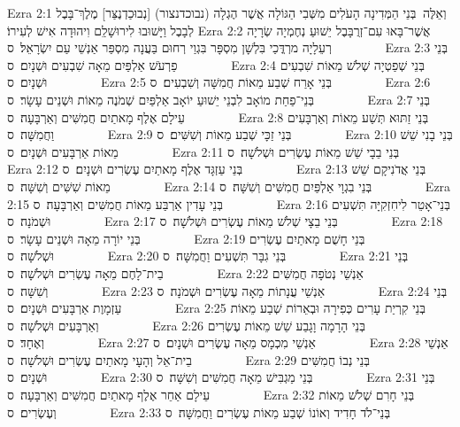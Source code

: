 Ezra 2:1	וְאֵלֶּה  בְּנֵי הַמְּדִינָה הָעֹלִים מִשְּׁבִי הַגּוֹלָה אֲשֶׁר הֶגְלָה (נבוכדנצור) [נְבוּכַדְנֶצַּר] מֶלֶךְ־בָּבֶל לְבָבֶל וַיָּשׁוּבוּ לִירוּשָׁלַ͏ִם וִיהוּדָה אִישׁ לְעִירוֹ׃
Ezra 2:2	אֲשֶׁר־בָּאוּ עִם־זְרֻבָּבֶל יֵשׁוּעַ נְחֶמְיָה שְׂרָיָה רְעֵלָיָה מרְדֳּכַי בִּלְשָׁן מִסְפָּר בִּגְוַי רְחוּם בַּעֲנָה מִסְפַּר אַנְשֵׁי עַם יִשְׂרָאֵל׃ {ס}        
Ezra 2:3	בְּנֵי פַרְעֹשׁ אַלְפַּיִם מֵאָה שִׁבְעִים וּשְׁנָיִם׃ {ס}        
Ezra 2:4	בְּנֵי שְׁפַטְיָה שְׁלֹשׁ מֵאוֹת שִׁבְעִים וּשְׁנָיִם׃ {ס}        
Ezra 2:5	בְּנֵי אָרַח שְׁבַע מֵאוֹת חֲמִשָּׁה וְשִׁבְעִים׃ {ס}        
Ezra 2:6	בְּנֵי־פַחַת מוֹאָב לִבְנֵי יֵשׁוּעַ יוֹאָב אַלְפַּיִם שְׁמֹנֶה מֵאוֹת וּשְׁנֵים עָשָׂר׃ {ס}        
Ezra 2:7	בְּנֵי עֵילָם אֶלֶף מָאתַיִם חֲמִשִּׁים וְאַרְבָּעָה׃ {ס}        
Ezra 2:8	בְּנֵי זַתּוּא תְּשַׁע מֵאוֹת וְאַרְבָּעִים וַחֲמִשָּׁה׃ {ס}        
Ezra 2:9	בְּנֵי זַכָּי שְׁבַע מֵאוֹת וְשִׁשִּׁים׃ {ס}        
Ezra 2:10	בְּנֵי בָנִי שֵׁשׁ מֵאוֹת אַרְבָּעִים וּשְׁנָיִם׃ {ס}        
Ezra 2:11	בְּנֵי בֵבָי שֵׁשׁ מֵאוֹת עֶשְׂרִים וּשְׁלֹשָׁה׃ {ס}        
Ezra 2:12	בְּנֵי עַזְגָּד אֶלֶף מָאתַיִם עֶשְׂרִים וּשְׁנָיִם׃ {ס}        
Ezra 2:13	בְּנֵי אֲדֹנִיקָם שֵׁשׁ מֵאוֹת שִׁשִּׁים וְשִׁשָּׁה׃ {ס}        
Ezra 2:14	בְּנֵי בִגְוָי אַלְפַּיִם חֲמִשִּׁים וְשִׁשָּׁה׃ {ס}        
Ezra 2:15	בְּנֵי עָדִין אַרְבַּע מֵאוֹת חֲמִשִּׁים וְאַרְבָּעָה׃ {ס}        
Ezra 2:16	בְּנֵי־אָטֵר לִיחִזְקִיָּה תִּשְׁעִים וּשְׁמֹנָה׃ {ס}        
Ezra 2:17	בְּנֵי בֵצָי שְׁלֹשׁ מֵאוֹת עֶשְׂרִים וּשְׁלֹשָׁה׃ {ס}        
Ezra 2:18	בְּנֵי יוֹרָה מֵאָה וּשְׁנֵים עָשָׂר׃ {ס}        
Ezra 2:19	בְּנֵי חָשֻׁם מָאתַיִם עֶשְׂרִים וּשְׁלֹשָׁה׃ {ס}        
Ezra 2:20	בְּנֵי גִבָּר תִּשְׁעִים וַחֲמִשָּׁה׃ {ס}        
Ezra 2:21	בְּנֵי בֵית־לָחֶם מֵאָה עֶשְׂרִים וּשְׁלֹשָׁה׃ {ס}        
Ezra 2:22	אַנְשֵׁי נְטֹפָה חֲמִשִּׁים וְשִׁשָּׁה׃ {ס}        
Ezra 2:23	אַנְשֵׁי עֲנָתוֹת מֵאָה עֶשְׂרִים וּשְׁמֹנָה׃ {ס}        
Ezra 2:24	בְּנֵי עַזְמָוֶת אַרְבָּעִים וּשְׁנָיִם׃ {ס}        
Ezra 2:25	בְּנֵי קִרְיַת עָרִים כְּפִירָה וּבְאֵרוֹת שְׁבַע מֵאוֹת וְאַרְבָּעִים וּשְׁלֹשָׁה׃ {ס}        
Ezra 2:26	בְּנֵי הָרָמָה וָגָבַע שֵׁשׁ מֵאוֹת עֶשְׂרִים וְאֶחָד׃ {ס}        
Ezra 2:27	אַנְשֵׁי מִכְמָס מֵאָה עֶשְׂרִים וּשְׁנָיִם׃ {ס}        
Ezra 2:28	אַנְשֵׁי בֵית־אֵל וְהָעָי מָאתַיִם עֶשְׂרִים וּשְׁלֹשָׁה׃ {ס}        
Ezra 2:29	בְּנֵי נְבוֹ חֲמִשִּׁים וּשְׁנָיִם׃ {ס}        
Ezra 2:30	בְּנֵי מַגְבִּישׁ מֵאָה חֲמִשִּׁים וְשִׁשָּׁה׃ {ס}        
Ezra 2:31	בְּנֵי עֵילָם אַחֵר אֶלֶף מָאתַיִם חֲמִשִּׁים וְאַרְבָּעָה׃ {ס}        
Ezra 2:32	בְּנֵי חָרִם שְׁלֹשׁ מֵאוֹת וְעֶשְׂרִים׃ {ס}        
Ezra 2:33	בְּנֵי־לֹד חָדִיד וְאוֹנוֹ שְׁבַע מֵאוֹת עֶשְׂרִים וַחֲמִשָּׁה׃ {ס}        
